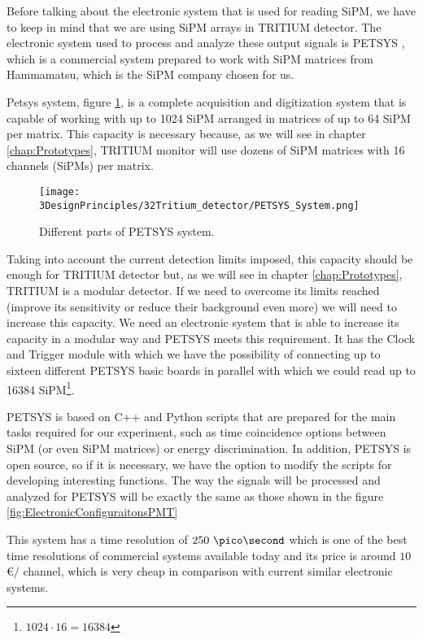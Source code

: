 Before talking about the electronic system that is used for reading SiPM, we have to keep in mind that we are using SiPM arrays in TRITIUM detector. The electronic system used to process and analyze these output signals is PETSYS \cite{PETSYS}, which is a commercial system prepared to work with SiPM matrices from Hammamatsu, which is the SiPM company chosen for us.

Petsys system, figure \ref{fig:PETSYS}, is a complete acquisition and digitization system that is capable of working with up to 1024 SiPM arranged in matrices of up to 64 SiPM per matrix. This capacity is necessary because, as we will see in chapter \ref{chap:Prototypes}, TRITIUM monitor will use dozens of SiPM matrices with 16 channels (SiPMs) per matrix.


\begin{figure}[htbp]
\centering
\texttt{[image: 3DesignPrinciples/32Tritium\_detector/PETSYS\_System.png]}
\caption{Different parts of PETSYS system.\label{fig:PETSYS}~\cite{PETSYS}}
\end{figure}

Taking into account the current detection limits imposed, this capacity should be enough for TRITIUM detector but, as we will see in chapter \ref{chap:Prototypes}, TRITIUM is a modular detector. If we need to overcome its limits reached (improve its sensitivity or reduce their background even more) we will need to increase this capacity. We need an electronic system that is able to increase its capacity in a modular way and PETSYS meets this requirement. It has the Clock and Trigger module with which we have the possibility of connecting up to sixteen different PETSYS basic boards in parallel with which we could read up to 16384 SiPM\footnote{$1024\cdot{}16 = 16384$}.

PETSYS is based on C++ and Python scripts that are prepared for the main tasks required for our experiment, such as time coincidence options between SiPM (or even SiPM matrices) or energy discrimination. In addition, PETSYS is open source, so if it is necessary, we have the option to modify the scripts for developing interesting functions. The way the signals will be processed and analyzed for PETSYS will be exactly the same as those shown in the figure \ref{fig:ElectronicConfiguraitonsPMT}

This system has a time resolution of $250~\pico\second$ which is one of the best time resolutions of commercial systems available today and its price is around $10$\euro$/$ channel, which is very cheap in comparison with current similar electronic systems.

